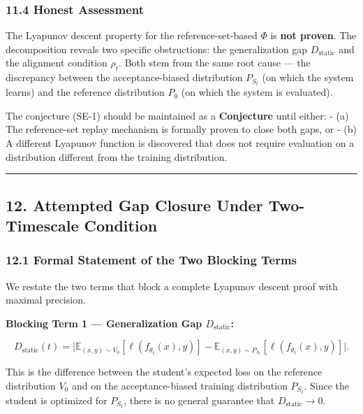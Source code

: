 \documentclass[
  12pt,
]{ctexart}
\begin{document}
\subsubsection{11.4 Honest Assessment}\label{honest-assessment}

The Lyapunov descent property for the reference-set-based \(\Phi\) is
\textbf{not proven}. The decomposition reveals two specific
obstructions: the generalization gap \(D_{\text{static}}\) and the
alignment condition \(\rho_t\). Both stem from the same root cause ---
the discrepancy between the acceptance-biased distribution \(P_{S_t}\)
(on which the system learns) and the reference distribution \(P_0\) (on
which the system is evaluated).

The conjecture (SE-1) should be maintained as a \textbf{Conjecture}
until either: - (a) The reference-set replay mechanism is formally
proven to close both gaps, or - (b) A different Lyapunov function is
discovered that does not require evaluation on a distribution different
from the training distribution.

\begin{center}\rule{0.5\linewidth}{0.5pt}\end{center}

\subsection{12. Attempted Gap Closure Under Two-Timescale
Condition}\label{attempted-gap-closure-under-two-timescale-condition}

\subsubsection{12.1 Formal Statement of the Two Blocking
Terms}\label{formal-statement-of-the-two-blocking-terms}

We restate the two terms that block a complete Lyapunov descent proof
with maximal precision.

\textbf{Blocking Term 1 --- Generalization Gap \(D_{\text{static}}\):}

\[D_{\text{static}}(t) = \bigl|\mathbb{E}_{(x,y) \sim V_0}[\ell(f_{\theta_t}(x), y)] - \mathbb{E}_{(x,y) \sim P_{S_t}}[\ell(f_{\theta_t}(x), y)]\bigr|.\]

This is the difference between the student's expected loss on the
reference distribution \(V_0\) and on the acceptance-biased training
distribution \(P_{S_t}\). Since the student is optimized for
\(P_{S_t}\), there is no general guarantee that
\(D_{\text{static}} \to 0\).
\end{document}
